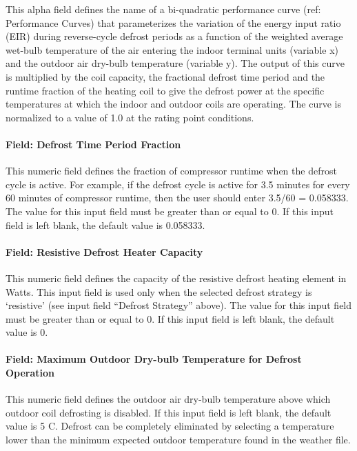 This alpha field defines the name of a bi-quadratic performance curve (ref: Performance Curves) that parameterizes the variation of the energy input ratio (EIR) during reverse-cycle defrost periods as a function of the weighted average wet-bulb temperature of the air entering the indoor terminal units (variable x) and the outdoor air dry-bulb temperature (variable y). The output of this curve is multiplied by the coil capacity, the fractional defrost time period and the runtime fraction of the heating coil to give the defrost power at the specific temperatures at which the indoor and outdoor coils are operating. The curve is normalized to a value of 1.0 at the rating point conditions.

\paragraph{Field: Defrost Time Period Fraction}\label{field-defrost-time-period-fraction-001}

This numeric field defines the fraction of compressor runtime when the defrost cycle is active. For example, if the defrost cycle is active for 3.5 minutes for every 60 minutes of compressor runtime, then the user should enter 3.5/60 = 0.058333. The value for this input field must be greater than or equal to 0. If this input field is left blank, the default value is 0.058333.

\paragraph{Field: Resistive Defrost Heater Capacity}\label{field-resistive-defrost-heater-capacity-001}

This numeric field defines the capacity of the resistive defrost heating element in Watts. This input field is used only when the selected defrost strategy is `resistive' (see input field ``Defrost Strategy'' above). The value for this input field must be greater than or equal to 0. If this input field is left blank, the default value is 0.

\paragraph{Field: Maximum Outdoor Dry-bulb Temperature for Defrost Operation}\label{field-maximum-outdoor-dry-bulb-temperature-for-defrost-operation-001}

This numeric field defines the outdoor air dry-bulb temperature above which outdoor coil defrosting is disabled. If this input field is left blank, the default value is 5 C. Defrost can be completely eliminated by selecting a temperature lower than the minimum expected outdoor temperature found in the weather file.

